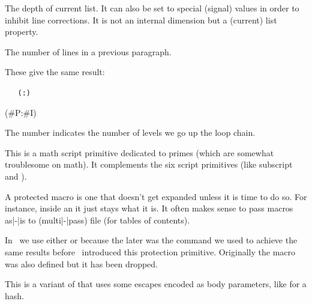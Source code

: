 The depth of current list. It can also be set to special (signal) values in order
to inhibit line corrections. It is not an internal dimension but a (current) list
property.

\stopoldprimitive

\startoldprimitive[title={\prm {prevgraf}}]

The number of lines in a previous paragraph.

\stopoldprimitive

\startnewprimitive[title={\prm {previousloopiterator}}]

\startbuffer
\edef\testA{
    \expandedrepeat 2 {%
        \expandedrepeat 3 {%
            (\the\previousloopiterator1:\the\currentloopiterator)
        }%
    }%
}
\edef\testB{
    \expandedrepeat 2 {%
        \expandedrepeat 3 {%
            (#P:#I) %
        }%
    }%
}
\stopbuffer

\typebuffer \getbuffer

These give the same result:

\startlines \tt
\meaningasis\testA
\meaningasis\testB
\stoplines

The number indicates the number of levels we go up the loop chain.

\stopnewprimitive

\startnewprimitive[title={\prm {primescript}}]

This is a math script primitive dedicated to primes (which are somewhat
troublesome on math). It complements the six script primitives (like \prm
{subscript} and ).

\stopnewprimitive

\startoldprimitive[title={\prm {protected}}]

A protected macro is one that doesn't get expanded unless it is time to do so.
For instance, inside an  it just stays what it is. It often makes
sense to pass macros as|-|is to (multi|-|pass) file (for tables of contents).

In \CONTEXT\ we use either  or  because the
later was the command we used to achieve the same results before \ETEX\
introduced this protection primitive. Originally the  macro was
also defined but it has been dropped.

\stopoldprimitive

\startnewprimitive[title={\prm {protecteddetokenize}}]

This is a variant of  that uses some escapes encoded as
body parameters, like \type {#H} for a hash.

